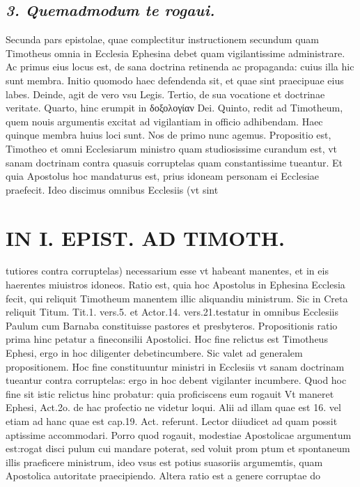 \documentclass{article}
\begin{document}
\begin{pages}
\subsection*{\textit{3. Quemadmodum te rogaui. }}\pstart Secunda pars epistolae, quae complectitur instructionem secundum quam Timotheus omnia in Ecclesia Ephesina debet quam vigilantissime administrare.  \pend\pstart Ac primus eius locus est, de sana doctrina retinenda ac propaganda: cuius illa hic sunt membra. Initio quomodo haec defendenda sit, et quae sint praecipuae eius labes. Deinde, agit de vero vsu Legis. Tertio, de sua vocatione et doctrinae veritate. Quarto, hinc erumpit in δοξολογίαν Dei. Quinto, redit ad Timotheum, quem nouis argumentis excitat ad vigilantiam in officio adhibendam. Haec quinque membra huius loci sunt. Nos de primo nunc agemus.  \pend\pstart Propositio est, Timotheo et omni Ecclesiarum ministro quam studiosissime curandum est, vt sanam doctrinam contra quasuis corruptelas quam constantissime tueantur. Et quia Apostolus hoc mandaturus est, prius idoneam personam ei Ecclesiae praefecit. Ideo discimus omnibus Ecclesiis (vt sint  \pend
\section*{IN I. EPIST. AD TIMOTH. }
\marginpar{[ p.17 ]}\pstart tutiores contra corruptelas) necessarium esse vt habeant manentes, et in eis haerentes miuistros idoneos. Ratio est, quia hoc Apostolus in Ephesina Ecclesia fecit, qui reliquit Timotheum manentem illic aliquandiu ministrum. Sic in Creta reliquit Titum. Tit.1. vers.5. et Actor.14. vers.21.testatur in omnibus Ecclesiis Paulum cum Barnaba constituisse pastores et presbyteros.  \pend\pstart Propositionis ratio prima hinc petatur a fineconsilii Apostolici. Hoc fine relictus est Timotheus Ephesi, ergo in hoc diligenter debetincumbere. Sic valet ad generalem propositionem. Hoc fine constituuntur ministri in Ecclesiis vt sanam doctrinam tueantur contra corruptelas: ergo in hoc debent vigilanter incumbere. Quod hoc fine sit istic relictus hinc probatur: quia proficiscens eum rogauit Vt maneret Ephesi, Act.2o. de hac profectio ne videtur loqui. Alii ad illam quae est 16. vel etiam ad hanc quae est cap.19. Act. referunt. Lector diiudicet ad quam possit aptissime accommodari. Porro quod rogauit, modestiae Apostolicae argumentum est:rogat disci pulum cui mandare poterat, sed voluit prom ptum et spontaneum illis praeficere ministrum, ideo vsus est potius suasoriis argumemtis, quam Apostolica autoritate praecipiendo. Altera ratio est a genere corruptae do\pend

\end{pages}
\end{document}
